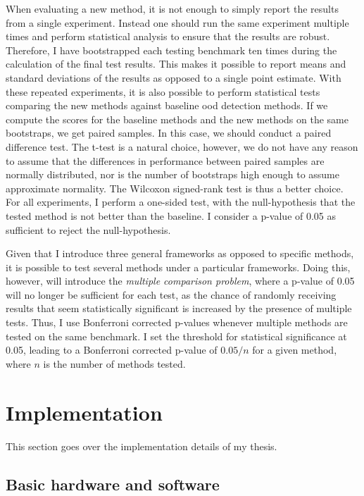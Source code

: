 \documentclass[UKenglish]{uiomasterthesis} %
\theoremstyle{definition}
\begin{document}
When evaluating a new method, it is not enough to simply report the results from a single experiment. Instead one should run the same experiment multiple times and perform statistical analysis to ensure that the results are robust. Therefore, I have bootstrapped each testing benchmark ten times during the calculation of the final test results. This makes it possible to report means and standard deviations of the results as opposed to a single point estimate. With these repeated experiments, it is also possible to perform statistical tests comparing the new methods against baseline \ac{ood} detection methods. If we compute the scores for the baseline methods and the new methods on the same bootstraps, we get paired samples. In this case, we should conduct a paired difference test. The t-test is a natural choice, however, we do not have any reason to assume that the differences in performance between paired samples are normally distributed, nor is the number of bootstraps high enough to assume approximate normality. The Wilcoxon signed-rank test is thus a better choice. For all experiments, I perform a one-sided test, with the null-hypothesis that the tested method is not better than the baseline. I consider a p-value of 0.05 as sufficient to reject the null-hypothesis.

Given that I introduce three general frameworks as opposed to specific methods, it is possible to test several methods under a particular frameworks. Doing this, however, will introduce the {\it multiple comparison problem}, where a p-value of 0.05 will no longer be sufficient for each test, as the chance of randomly receiving results that seem statistically significant is increased by the presence of multiple tests. Thus, I use Bonferroni corrected p-values whenever multiple methods are tested on the same benchmark. I set the threshold for statistical significance at 0.05, leading to a Bonferroni corrected p-value of $0.05 / n$ for a given method, where $n$ is the number of methods tested.

\section{Implementation}

This section goes over the implementation details of my thesis.

\subsection{Basic hardware and software}
\end{document}
